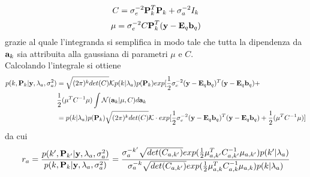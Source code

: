 \begin{equation}
C=\sigma_e^{-2}\textbf{P}_k^T\textbf{P}_k+\sigma_a^{-2} I_k
\end{equation}
\begin{equation}
\mu=\sigma_e^{-2} C\textbf{P}_k^T(\textbf{y}-\textbf{E}_q\textbf{b}_q)
\end{equation}
grazie al quale l’integranda si semplifica in modo tale che tutta la dipendenza da $\textbf{a}_k$ sia attribuita alla gaussiana di parametri $\mu$ e $C$.\\
Calcolando l’integrale si ottiene
\begin{align*}
p(k,\textbf{P}_k | \textbf{y},\lambda_a,\sigma_a^2)&=\sqrt{(2\pi)^k det(C)}\mathcal{K}p(k |\lambda_a)p(\textbf{P}_k) exp[\frac{1}{2}\sigma_e^{-2}(\textbf{y}-\textbf{E}_q\textbf{b}_q)^{T}(\textbf{y}-\textbf{E}_q\textbf{b}_q)+\\&\frac{1}{2}(\mu^T C^{-1}\mu)\int \mathcal{N}(\textbf{a}_k|\mu,C)d\textbf{a}_k\\
&=p(k|\lambda_a)p(\textbf{P}_k)\sqrt{(2\pi)^k det(C)}\mathcal{K}\cdot exp[\frac{1}{2} \sigma_e^{-2}(\textbf{y}-\textbf{E}_q\textbf{b}_q)^{T}(\textbf{y}-\textbf{E}_q\textbf{b}_q)+\frac{1}{2}(\mu^T C^{-1}\mu)]
\end{align*}
da cui
\begin{equation}
r_a=\frac{p(k',\textbf{P}_{k'}|\textbf{y},\lambda_a,\sigma_a^2)}{p(k,\textbf{P}_k|\textbf{y},\lambda_a,\sigma_a^2)}=\frac{\sigma_a^{-k'}\sqrt{det(C_{a,k'})}
exp(\frac{1}{2}\mu_{a,k'}^TC_{a,k'}^{-1}\mu_{a,k'})p(k'|\lambda_a)}{\sigma_a^{-k}\sqrt{det(C_{a,k'})}
exp(\frac{1}{2}\mu_{a,k}^TC_{a,k}^{-1}\mu_{a,k})p(k|\lambda_a)}
\end{equation}

